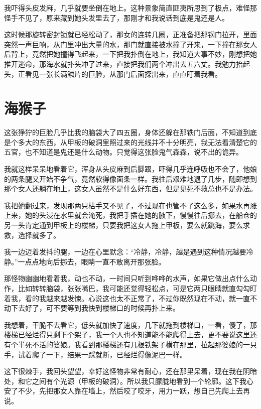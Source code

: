 我吓得头皮发麻，几乎就要坐倒在地上。这种景象简直匪夷所思到了极点，难怪那怪手不见了，原来藏到她头发里去了，那刚才和我说话到底是鬼还是人。

这时候那旋转密封锁就已经松动了，那女的连转几圈，正准备把那钢门拉开，里面突然一声巨响，从门里冲出大量的水，那门就直接被水撞了开来，一下撞在那女人后背上，竟然把她撞得飞起来，一下把我扑倒在地上，我知道大事不妙，刚想把她推开逃命，那海水就扑头冲了过来，直接把我们两个冲出去五六丈。我勉力抬起头，正看见一张长满鳞片的巨脸，从那门后面探出来，直直盯着我看。

\chapter{海猴子}

这张狰狞的巨脸几乎比我的脑袋大了四五圈，身体还躲在那铁门后面，不知道到底是个多大的东西，从甲板的破洞里照过来的光线并不十分明亮，我无法看清楚它的五官，也不知道是鬼还是什么动物。只觉得这张脸鬼气森森，说不出的诡异。

我就这样呆呆地看着它，浑身从头皮麻到后脚跟，吓得几乎连呼吸也不会了，他娘的两条腿又开始不争气，竟然软得像面条一样。我往后艰难地退了几步，随即想到那个女人还躺在地上，这女人虽然不是什么好东西，但是见死不救总也不是办法。

我把她翻过来，发现那两只枯手又不见了，不过现在也管不了这么多，如果水再涨上来，她的头浸在水里就会淹死，我把手插在她的腋下，慢慢往后挪去，在船仓的另一头肯定通到甲板上的楼梯，只要我把这女人拖上甲板，要么就跳海，要么求救，选择就多了。

我一边迈着发抖的腿，一边在心里默念：“冷静，冷静，越是遇到这种情况越要冷静。”一点点地向后挪去，眼睛一直不敢离开那张脸。

那怪物幽幽地看着我，动也不动，一时间只听到哗哗的水声，如果它做出点什么动作，比如转转脑袋，张张嘴巴，我可能还觉得轻松点，可是它两只眼睛就直勾勾盯着我，看的我越来越发悚。心说这也太不正常了，不过你既然现在不动，就一直不动下去好了，可不要等到我快到楼梯口的时候再扑上来。

我想着，干脆不去看它，低头就加快了速度，几下就拖到楼梯口，一看，傻了，那楼梯已经烂得只剩下个架子，我一个人也不知道能不能爬得上去，更不要说这里还有个半死不活的婆娘。我看到那楼梯还有几根铁架子横在那里，拉起那婆娘的一只手，试着爬了一下，结果一踩就断，已经烂得像泥巴一样。

这下很棘手，我回头望望，幸好这怪物非常有耐心，还在那里呆着，现在我在阴暗处，和它之间有个光源（甲板的破洞）。所以我只朦胧地看到一个轮廓。这下我心安了不少，先把那女人靠在墙上，然后咬了咬牙，用力一跃，想自己先爬上去再说。

